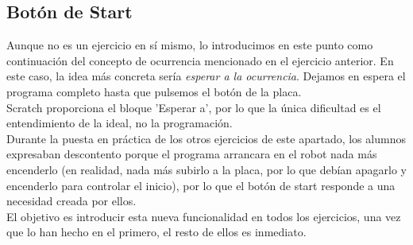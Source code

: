 \subsection{Botón de Start}\label{ej:start}
Aunque no es un ejercicio en sí mismo, lo introducimos en este punto como continuación del concepto de ocurrencia mencionado en el ejercicio anterior. En este caso, la idea más concreta sería \textit{esperar a la ocurrencia}. Dejamos en espera el programa completo hasta que pulsemos el botón de la placa.\\
Scratch proporciona el bloque 'Esperar a', por lo que la única dificultad es el entendimiento de la ideal, no la programación. \\
Durante la puesta en práctica de los otros ejercicios de este apartado, los alumnos expresaban descontento porque el programa arrancara en el robot nada más encenderlo (en realidad, nada más subirlo a la placa, por lo que debían apagarlo y encenderlo para controlar el inicio), por lo que el botón de start responde a una necesidad creada por ellos. \\
El objetivo es introducir esta nueva funcionalidad en todos los ejercicios, una vez que lo han hecho en el primero, el resto de ellos es inmediato.

